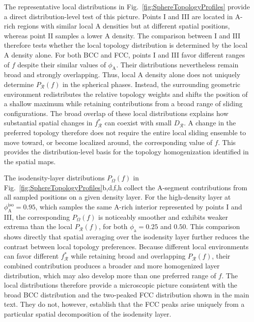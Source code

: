 \documentclass[journal=mamobx,manuscript=article]{achemso}
\begin{document}
	The representative local distributions in Fig.~\ref{fig:SphereTopologyProfiles} provide a direct distribution-level test of this picture.
	Points I and III are located in A-rich regions with similar local A densities but at different spatial positions, whereas point II samples a lower A density.
	The comparison between I and III therefore tests whether the local topology distribution is determined by the local A density alone.
	For both BCC and FCC, points I and III favor different ranges of $f$ despite their similar values of $\phi_{\mathrm A}$.
	Their distributions nevertheless remain broad and strongly overlapping.
	Thus, local A density alone does not uniquely determine $P_{\mathcal R}(f)$ in the spherical phases.
	Instead, the surrounding geometric environment redistributes the relative topology weights and shifts the position of a shallow maximum while retaining contributions from a broad range of sliding configurations.
	The broad overlap of these local distributions explains how substantial spatial changes in $f_{\mathcal R}^\ast$ can coexist with small $D_{\mathcal R}$.
	A change in the preferred topology therefore does not require the entire local sliding ensemble to move toward, or become localized around, the corresponding value of $f$.
	This provides the distribution-level basis for the topology homogenization identified in the spatial maps.


	The isodensity-layer distributions $P_\Omega(f)$ in Fig.~\ref{fig:SphereTopologyProfiles}b,d,f,h collect the A-segment contributions from all sampled positions on a given density layer.
	For the high-density layer at $\phi_{\mathrm A}^{\mathrm{iso}}=0.95$, which samples the same A-rich interior represented by points I and III, the corresponding $P_\Omega(f)$ is noticeably smoother and exhibits weaker extrema than the local $P_{\mathcal R}(f)$, for both $\phi_{\mathrm a}=0.25$ and $0.50$.
	This comparison shows directly that spatial averaging over the isodensity layer further reduces the contrast between local topology preferences.
	Because different local environments can favor different $f_{\mathcal R}^\ast$ while retaining broad and overlapping $P_{\mathcal R}(f)$, their combined contribution produces a broader and more homogenized layer distribution, which may also develop more than one preferred range of $f$.
	The local distributions therefore provide a microscopic picture consistent with the broad BCC distribution and the two-peaked FCC distribution shown in the main text.
	They do not, however, establish that the FCC peaks arise uniquely from a particular spatial decomposition of the isodensity layer.
\end{document}
